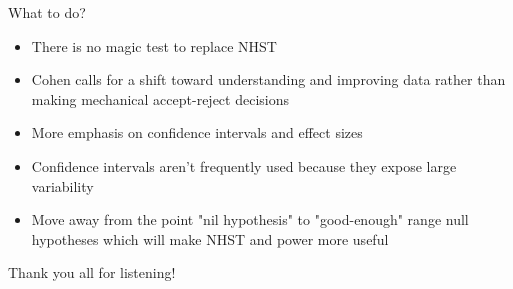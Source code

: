 \documentclass[aspectratio=169, 12pt]{beamer}
\begin{document}
\begin{frame}{What to do?}
  \begin{itemize}
  \item There is no magic test to replace NHST
  \item Cohen calls for a shift toward understanding and improving data rather than making mechanical accept-reject decisions
  \item More emphasis on confidence intervals and effect sizes
  \item Confidence intervals aren't frequently used because they expose large variability
  \item Move away from the point "nil hypothesis" to "good-enough" range null hypotheses which will make NHST and power more useful
  \end{itemize}
\end{frame}

\begin{frame}{}
  \begin{itemize}
    \centering
    {\Huge Thank you all for listening!}
  \end{itemize}
\end{frame}
\end{document}
